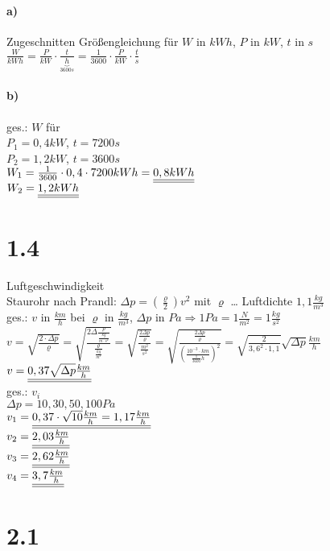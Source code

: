 \paragraph{a)} Zugeschnitten Größengleichung für $W$ in $kWh$, $P$ in $kW$, $t$ in $s$\\
$\frac{W}{kWh}=\frac{P}{kW}\cdot \frac{t}{\underbrace{h}_{3600s}}=\frac{1}{3600}\cdot \frac{P}{kW} \cdot \frac{t}{s}$

\paragraph{b)} ges.: $W$ für\\
$P_1=0,4kW$, $t=7200s$\\
$P_2=1,2kW$, $t=3600s$\medskip\\
$W_1=\frac{1}{3600} \cdot 0,4 \cdot 7200kWh=\underline{\underline{0,8kWh}}$\smallskip\\
$W_2=\underline{\underline{1,2kWh}}$

\section*{1.4}
Luftgeschwindigkeit\\
Staurohr nach Prandl: $\Delta p = (\frac{\varrho}{2})v^2$ mit $\varrho$ … Luftdichte $1,1 \frac{kg}{m^3}$\\
ges.: $v$ in $\frac{km}{h}$ bei $\varrho$ in $\frac{kg}{m^3}$, $\Delta p$ in $Pa \Rightarrow 1 Pa = 1\frac{N}{m^2}= 1 \frac{kg}{s^2}$\\
$v=\sqrt{\frac{2\cdot \Delta p}{\varrho}}=\sqrt{\frac{2\Delta \frac{p}{\frac{kg}{m\cdot s^2}}}{\frac{\varrho}{\frac{kg}{m^3}}}}=\sqrt{\frac{\frac{2\Delta p}{\varrho}}{\frac{m^2}{s^2}}}=\sqrt{\frac{\frac{2 \Delta p}{\varrho}}{(\frac{10^{-3}\cdot km}{\frac{1}{3600}h})^2}}=\sqrt{\frac{2}{3,6^2\cdot 1,1}}\sqrt{\Delta p}\frac{km}{h}$\\
$v=\underline{\underline{0,37\sqrt{\Delta p}\frac{km}{h}}}$\medskip\\
ges.: $v_i$\\
$\Delta p = 10,30,50,100 Pa$\\
$v_1=\underline{\underline{0,37\cdot \sqrt{10}\frac{km}{h}=1,17\frac{km}{h}}}$\\
$v_2=\underline{\underline{2,03\frac{km}{h}}}$\\
$v_3=\underline{\underline{2,62\frac{km}{h}}}$\\
$v_4=\underline{\underline{3,7 \frac{km}{h}}}$

\section*{2.1}

